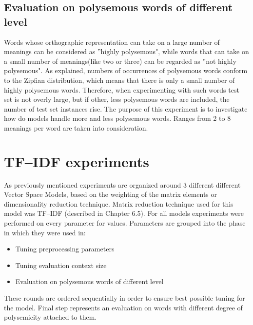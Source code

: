 \subsection{Evaluation on polysemous words of different level } 
Words whose orthographic representation can take on a large number of meanings can be considered
as ''highly polysemous", while words that can take on a small number of meanings(like two or three) can 
be regarded as ''not highly polysemous". As explained, numbers of occurrences of polysemous words 
conform to the Zipfian distribution, which means that there is only a small number of highly polysemous
words. Therefore, when experimenting with such words test set is not overly large, but if other, less
polysemous words are included, the number of test set instances rise. The purpose of this experiment
is to investigate how do models handle more and less polysemous words. Ranges from 2 to 8 meanings per word
are taken into consideration.




\section{TF--IDF experiments}
As previously mentioned experiments are organized around 3 different different Vector Space Models, 
based on the weighting of the matrix elements or dimensionality reduction technique. Matrix reduction technique used for this model was TF--IDF (described in Chapter 6.5). For all models experiments were performed on every parameter for values. Parameters are grouped into the phase in which they were used in:
\begin{itemize}
\item Tuning preprocessing parameters
\item Tuning evaluation context size
\item Evaluation on polysemous words of different level
\end{itemize}
These rounds are ordered sequentially in order to ensure best possible tuning for the model. Final step
represents an evaluation on words with different degree of polysemicity attached to them.

